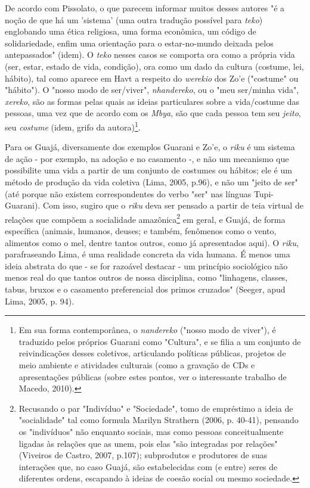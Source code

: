 De acordo com Pissolato, o que parecem informar muitos desses autores "é
a noção de que há um 'sistema' (uma outra tradução possível para
\emph{teko}) englobando uma ética religiosa, uma forma econômica, um
código de solidariedade, enfim uma orientação para o estar-no-mundo
deixada pelos antepassados" (idem). O \emph{teko} nesses casos se
comporta ora como a própria vida (ser, estar, estado de vida, condição),
ora como um dado da cultura (costume, lei, hábito), tal como aparece em
Havt a respeito do \emph{werekio} dos Zo'e ("costume" ou "hábito"). O
"nosso modo de ser/viver", \emph{nhandereko}, ou o "meu ser/minha vida",
\emph{xereko}, são as formas pelas quais as ideias particulares sobre a
vida/costume das pessoas, uma vez que de acordo com os \emph{Mbya}, são
que cada pessoa tem seu \emph{jeito}, seu \emph{costume} (idem, grifo da
autora)\footnote{Em sua forma contemporânea, o \emph{nandereko} ("nosso
  modo de viver"), é traduzido pelos próprios Guarani como "Cultura", e
  se filia a um conjunto de reivindicações desses coletivos, articulando
  políticas públicas, projetos de meio ambiente e atividades culturais
  (como a gravação de CDs e apresentações públicas (sobre estes pontos,
  ver o interessante trabalho de Macedo, 2010).}.

Para os Guajá, diversamente dos exemplos Guarani e Zo'e, o \emph{riku} é
um sistema de ação - por exemplo, na adoção e no casamento -, e não um
mecanismo que possibilite uma vida a partir de um conjunto de costumes
ou hábitos; ele é um método de produção da vida coletiva (Lima, 2005,
p.96), e não um "jeito de ser" (até porque não existem correspondentes
do verbo "ser" nas línguas Tupi-Guarani). Com isso, sugiro que o
\emph{riku} deva ser pensado a partir de teia virtual de relações que
compõem a socialidade amazônica\footnote{Recusando o par "Indivíduo" e
  "Sociedade", tomo de empréstimo a ideia de "socialidade" tal como
  formula Marilyn Strathern (2006, p. 40-41), pensando os "indivíduos"
  não enquanto sociais, mas como pessoas conceitualmente ligadas às
  relações que as unem, pois elas "são integradas por relações"
  (Viveiros de Castro, 2007, p.107); subprodutos e produtores de suas
  interações que, no caso Guajá, são estabelecidas com (e entre) seres
  de diferentes ordens, escapando à ideias de coesão social ou mesmo
  sociedade.} em geral, e Guajá, de forma específica (animais, humanos,
deuses; e também, fenômenos como o vento, alimentos como o mel, dentre
tantos outros, como já apresentados aqui). O \emph{riku}, parafraseando
Lima, é uma realidade concreta da vida humana. É menos uma ideia
abstrata do que - se for razoável destacar - um princípio sociológico
não menos real do que tantos outros de nossa disciplina, como
"linhagens, classes, tabus, bruxos e o casamento preferencial dos primos
cruzados" (Seeger, apud Lima, 2005, p. 94).

